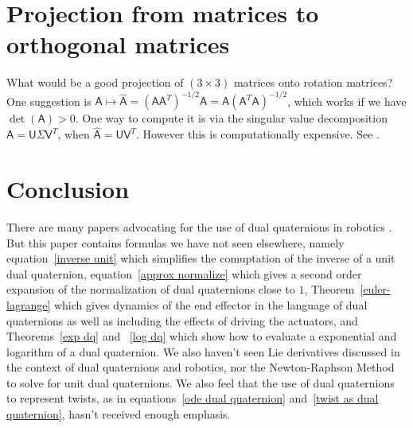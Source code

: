 \documentclass[reqno,12pt]{amsart}
\begin{document}
\section{Projection from matrices to orthogonal matrices}
\label{sec final note}

What would be a good projection of $(3 \times 3)$ matrices onto rotation matrices?  One suggestion is $\mathsf A \mapsto \widehat{\mathsf A} = (\mathsf A\mathsf A^T)^{-1/2} \mathsf A = \mathsf A (\mathsf A^T \mathsf A)^{-1/2}$, which works if we have $\det(\mathsf A) > 0$.  One way to compute it is via the singular value decomposition $\mathsf A = \mathsf U \mathsf \Sigma \mathsf V^T$, when $\widehat{\mathsf A} = \mathsf U\mathsf V^T$.  However this is computationally expensive.  See \cite{higham}.

\section{Conclusion}

There are many papers advocating for the use of dual quaternions in robotics \cite{adorno,han-et-al,wang-et-al}.  But this paper contains formulas we have not seen elsewhere, namely equation~\eqref{inverse unit} which simplifies the comuptation of the inverse of a unit dual quaternion, equation~\eqref{approx normalize} which gives a second order expansion of the normalization of dual quaternions close to $1$, Theorem~\ref{euler-lagrange} which gives dynamics of the end effector in the language of dual quaternions as well as including the effects of driving the actuators, and Theorems~\ref{exp dq} and ~\ref{log dq} which show how to evaluate a exponential and logarithm of a dual quaternion.  We also haven't seen Lie derivatives discussed in the context of dual quaternions and robotics, nor the Newton-Raphson Method to solve for unit dual quaternions.  We also feel that the use of dual quaternions to represent twists, as in equations~\eqref{ode dual quaternion} and~\eqref{twist as dual quaternion}, hasn't received enough emphasis.
\end{document}
